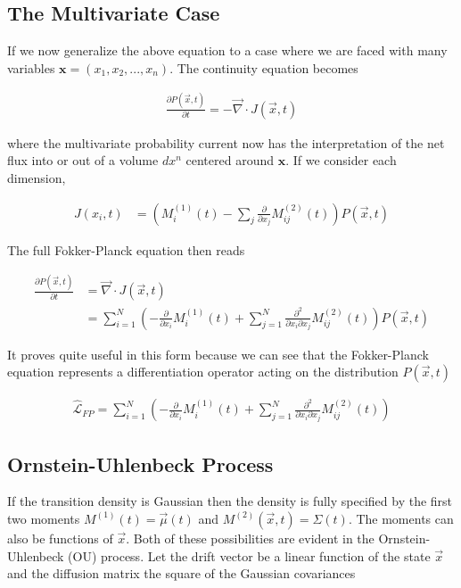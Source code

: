 \documentclass{article}
\begin{document}
\subsection{The Multivariate Case}

If we now generalize the above equation to a case where we are faced with many variables $\bm{x} = (x_{1},x_{2},...,x_{n})$. The continuity equation becomes 

\begin{align}
\frac{\partial P(\vec{x},t)}{\partial t} = -\vec{\nabla} \cdot J(\vec{x},t)
\end{align}

where the multivariate probability current now has the interpretation of the net flux into or out of a volume $dx^{n}$ centered around $\bm{x}$. If we consider each dimension, 

\begin{align}
J(x_{i},t)  &= \left(M_{i}^{(1)}(t) - \sum_{j}\frac{\partial}{\partial x_{j}}M_{ij}^{(2)}(t) \right)P(\vec{x},t)
\end{align}

The full Fokker-Planck equation then reads

\begin{align}
\frac{\partial P(\vec{x},t)}{\partial t}  &= \vec{\nabla} \cdot J(\vec{x},t)\\
&= \sum_{i=1}^{N}\left(-\frac{\partial}{\partial x_{i}}M_{i}^{(1)}(t) + \sum_{j=1}^{N} \frac{\partial^{2}}{\partial x_{i}\partial x_{j}}M_{ij}^{(2)}(t)\right)P(\vec{x},t)
\end{align}

It proves quite useful in this form because we can see that the Fokker-Planck equation represents a differentiation operator acting on the distribution $P(\vec{x},t)$

\begin{align}
\hat{\mathcal{L}}_{FP} = \sum_{i=1}^{N}\left(-\frac{\partial}{\partial x_{i}}M_{i}^{(1)}(t) + \sum_{j=1}^{N} \frac{\partial^{2}}{\partial x_{i}\partial x_{j}}M_{ij}^{(2)}(t)\right)
\end{align}

\subsection{Ornstein-Uhlenbeck Process}

If the transition density is Gaussian then the density is fully specified by the first two moments $M^{(1)}(t) = \vec{\mu}(t)$ and $M^{(2)}(\vec{x},t) = \Sigma(t)$. The moments can also be functions of $\vec{x}$. Both of these possibilities are evident in the Ornstein-Uhlenbeck (OU) process. Let the drift vector be a linear function of the state $\vec{x}$ and the diffusion matrix the square of the Gaussian covariances
\end{document}
